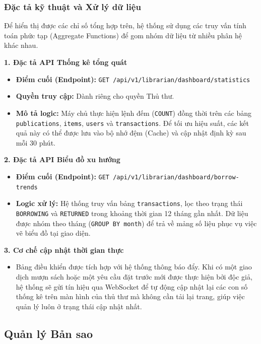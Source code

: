 \vspace{0.5cm}
\subsubsection{Đặc tả kỹ thuật và Xử lý dữ liệu}

Để hiển thị được các chỉ số tổng hợp trên, hệ thống sử dụng các truy vấn tính toán phức tạp (Aggregate Functions) để gom nhóm dữ liệu từ nhiều phân hệ khác nhau.

\noindent\textbf{1. Đặc tả API Thống kê tổng quát}
\begin{itemize}
    \item \textbf{Điểm cuối (Endpoint):} \texttt{GET /api/v1/librarian/dashboard/statistics}
    \item \textbf{Quyền truy cập:} Dành riêng cho quyền Thủ thư.
    \item \textbf{Mô tả logic:} Máy chủ thực hiện lệnh đếm (\texttt{COUNT}) đồng thời trên các bảng \texttt{publications}, \texttt{items}, \texttt{users} và \texttt{transactions}. Để tối ưu hiệu suất, các kết quả này có thể được lưu vào bộ nhớ đệm (Cache) và cập nhật định kỳ sau mỗi 30 phút.
\end{itemize}

\noindent\textbf{2. Đặc tả API Biểu đồ xu hướng}
\begin{itemize}
    \item \textbf{Điểm cuối (Endpoint):} \texttt{GET /api/v1/librarian/dashboard/borrow-trends}
    \item \textbf{Logic xử lý:} Hệ thống truy vấn bảng \texttt{transactions}, lọc theo trạng thái \texttt{BORROWING} và \texttt{RETURNED} trong khoảng thời gian 12 tháng gần nhất. Dữ liệu được nhóm theo tháng (\texttt{GROUP BY month}) để trả về mảng số liệu phục vụ việc vẽ biểu đồ tại giao diện.
\end{itemize}

\noindent\textbf{3. Cơ chế cập nhật thời gian thực}
\begin{itemize}
    \item Bảng điều khiển được tích hợp với hệ thống thông báo đẩy. Khi có một giao dịch mượn sách hoặc một yêu cầu đặt trước mới được thực hiện bởi độc giả, hệ thống sẽ gửi tín hiệu qua WebSocket để tự động cập nhật lại các con số thống kê trên màn hình của thủ thư mà không cần tải lại trang, giúp việc quản lý luôn ở trạng thái cập nhật nhất.
\end{itemize}


\subsection{Quản lý Bản sao }

